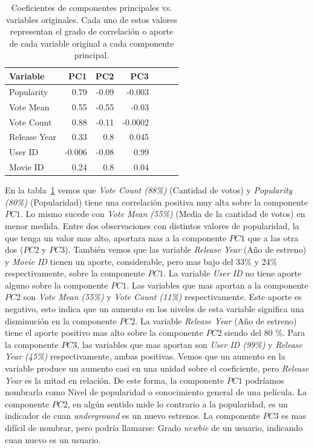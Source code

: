 \documentclass[11pt,a4paper,twoside]{thesis}
\begin{document}
\begin{table}[h!]
	\centering
	\begin{tabular}{lrrrrrr}
		\toprule Variable   & PC1    & PC2   & PC3     \\
		\midrule Popularity & 0.79   & -0.09 & -0.003  \\
		Vote Mean           & 0.55   & -0.55 & -0.03   \\
		Vote Count          & 0.88   & -0.11 & -0.0002 \\
		Release Year        & 0.33   & 0.8   & 0.045   \\
		User ID             & -0.006 & -0.08 & 0.99    \\
		Movie ID            & 0.24   & 0.8   & 0.04    \\
		\bottomrule
	\end{tabular}

	\caption{Coeficientes de componentes principales vs. variables originales. Cada uno de estos valores representan el grado de correlación o aporte de cada variable original a cada componente principal.}

	\label{fig:loadingsTable}
\end{table}

En la tabla~\ref{fig:loadingsTable} vemos que \textit{Vote Count (88\%)}
(Cantidad de votos) y \textit{Popularity (80\%)} (Popularidad) tiene una
correlación positiva muy alta sobre la componente $PC1$. Lo mismo sucede con
\textit{Vote Mean (55\%)} (Media de la cantidad de votos) en menor medida.
Entre dos observaciones con distintos valores de popularidad, la que tenga un
valor mas alto, aportara mas a la componente $PC1$ que a las otra dos ($PC2$ y
$PC3$). También vemos que las variable \textit{Release Year} (Año de estreno) y
\textit{Movie ID} tienen un aporte, considerable, pero mas bajo del 33\% y 24\%
respectivamente, sobre la componente $PC1$. La variable \textit{User ID} no
tiene aporte alguno sobre la componente $PC1$. Las variables que mas aportan a
la componente $PC2$ son \textit{Vote Mean (55\%)} y \textit{Vote Count (11\%)}
respectivamente. Este aporte es negativo, esto indica que un aumento en los
niveles de esta variable significa una disminución en la componente $PC2$. La
variable \textit{Release Year} (Año de estreno) tiene el aporte positivo mas
alto sobre la componente $PC2$ siendo del 80 \%. Para la componente $PC3$, las
variables que mas aportan son \textit{User ID (99\%)} y \textit{Release Year
	(45\%)} respectivamente, ambas positivas. Vemos que un aumento en la variable
 produce un aumento casi en una unidad sobre el coeficiente, pero
\textit{Release Year} es la mitad en relación. De este forma, la componente
$PC1$ podríamos nombrarla como Nivel de popularidad o conocimiento general de
una película. La componente $PC2$, en algún sentido mide lo contrario a la
popularidad, es un indicador de cuan \textit{underground} es un nuevo estrenos.
La componente $PC3$ es mas difícil de nombrar, pero podría llamarse: Grado
\textit{newbie} de un usuario, indicando cuan nuevo es un usuario.
\end{document}
